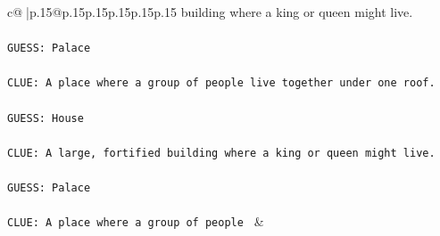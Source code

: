 \documentclass{article}
\begin{document}
{\begin{supertabular}{c@{$\;$}|p{.15\linewidth}@{}p{.15\linewidth}p{.15\linewidth}p{.15\linewidth}p{.15\linewidth}p{.15\linewidth}}
{{{building where a king or queen might live.\\ \tt \\ \tt GUESS: Palace\\ \tt \\ \tt CLUE: A place where a group of people live together under one roof.\\ \tt \\ \tt GUESS: House\\ \tt \\ \tt CLUE: A large, fortified building where a king or queen might live.\\ \tt \\ \tt GUESS: Palace\\ \tt \\ \tt CLUE: A place where a group of people 
	  } 
	   } 
	   } 
	 & \\ 
 

    \theutterance {}  


\end{supertabular}}
\end{document}
